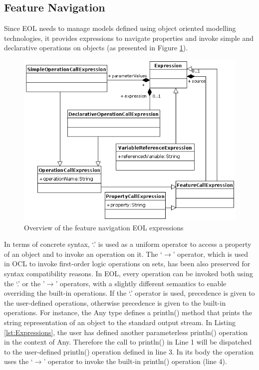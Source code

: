 \subsection{Feature Navigation}
\label{sec:Design.EOL.FeatureNavigation}
Since EOL needs to manage models defined using object oriented modelling technologies, it provides expressions to navigate properties and invoke simple and declarative operations on objects (as presented in Figure \ref{fig:EOLExpressions}). 

\begin{figure}
	\centering
		\includegraphics{images/EOLExpressions.png}
	\caption{Overview of the feature navigation EOL expressions}
	\label{fig:EOLExpressions}
\end{figure}



In terms of concrete syntax, `.' is used as a uniform operator to access a property of an object and to invoke an operation on it. The `$\rightarrow$' operator, which is used in OCL to invoke first-order logic operations on sets, has been also preserved for syntax compatibility reasons. In EOL, every operation can be invoked both using the `.' or the '$\rightarrow$' operators, with a slightly different semantics to enable overriding the built-in operations. If the `.' operator is used, precedence is given to the user-defined operations, otherwise precedence is given to the built-in operations. For instance, the Any type defines a println() method that prints the string representation of an object to the standard output stream. In Listing \ref{lst:Expressions}, the user has defined another parameterless println() operation in the context of Any. Therefore the call to println() in Line 1 will be dispatched to the user-defined println() operation defined in line 3. In its body the operation uses the `$\rightarrow$' operator to invoke the built-in println() operation (line 4).

